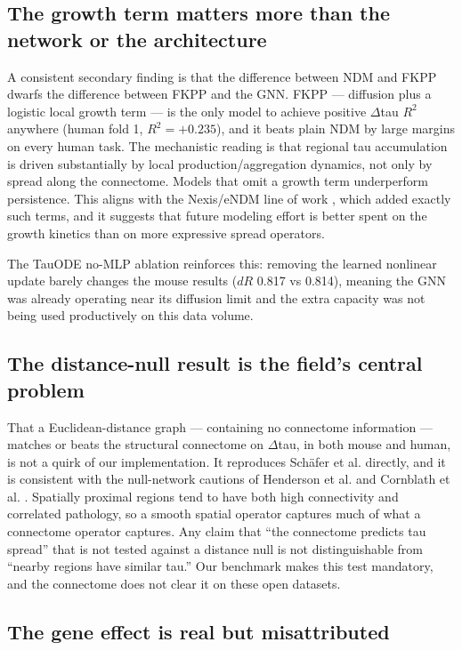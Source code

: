 \documentclass{article}
\begin{document}
\subsection{The growth term matters more than the network or the architecture}

A consistent secondary finding is that the difference between NDM and FKPP dwarfs the difference between FKPP and the GNN. FKPP --- diffusion plus a logistic local growth term --- is the only model to achieve positive $\Delta$tau $R^2$ anywhere (human fold 1, $R^2 = +0.235$), and it beats plain NDM by large margins on every human task. The mechanistic reading is that regional tau accumulation is driven substantially by local production/aggregation dynamics, not only by spread along the connectome. Models that omit a growth term underperform persistence. This aligns with the Nexis/eNDM line of work \cite{anand2022}, which added exactly such terms, and it suggests that future modeling effort is better spent on the growth kinetics than on more expressive spread operators.

The TauODE no-MLP ablation reinforces this: removing the learned nonlinear update barely changes the mouse results ($dR$ 0.817 vs 0.814), meaning the GNN was already operating near its diffusion limit and the extra capacity was not being used productively on this data volume.

\subsection{The distance-null result is the field's central problem}

That a Euclidean-distance graph --- containing no connectome information --- matches or beats the structural connectome on $\Delta$tau, in both mouse and human, is not a quirk of our implementation. It reproduces Sch\"afer et al. \cite{schafer2020} directly, and it is consistent with the null-network cautions of Henderson et al. \cite{henderson2019} and Cornblath et al. \cite{cornblath2021}. Spatially proximal regions tend to have both high connectivity and correlated pathology, so a smooth spatial operator captures much of what a connectome operator captures. Any claim that ``the connectome predicts tau spread'' that is not tested against a distance null is not distinguishable from ``nearby regions have similar tau.'' Our benchmark makes this test mandatory, and the connectome does not clear it on these open datasets.

\subsection{The gene effect is real but misattributed}
\end{document}
